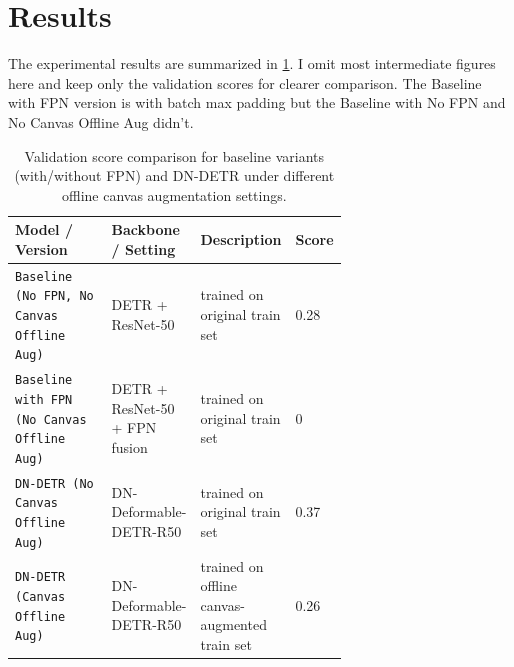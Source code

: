 \documentclass[runningheads]{llncs}
\begin{document}
\section{Results}
\label{sec:results}

The experimental results are summarized in \cref{tab:results}. I omit most intermediate figures here and keep only the validation scores for clearer comparison. The Baseline with FPN version is with batch max padding but the Baseline with No FPN and No Canvas Offline Aug didn't.

\begin{table}[tb]
    \caption{Validation score comparison for baseline variants (with/without FPN) and DN-DETR under different offline canvas augmentation settings.}
    \label{tab:results}
    \centering
    \scriptsize
    \setlength{\tabcolsep}{4pt}
    \begin{tabularx}{\linewidth}{@{}p{0.34\linewidth}p{0.24\linewidth}Xp{0.08\linewidth}@{}}
        \toprule
        Model / Version & Backbone / Setting & Description & Score \\
        \midrule
        \texttt{Baseline (No FPN, No Canvas Offline Aug)} & DETR + ResNet-50 & trained on original train set & 0.28 \\
        \texttt{Baseline with FPN (No Canvas Offline Aug)} & DETR + ResNet-50 + FPN fusion & trained on original train set & 0 \\
        \texttt{DN-DETR (No Canvas Offline Aug)} & DN-Deformable-DETR-R50 & trained on original train set & 0.37 \\
        \texttt{DN-DETR (Canvas Offline Aug)} & DN-Deformable-DETR-R50 & trained on offline canvas-augmented train set & 0.26 \\
        \bottomrule
    \end{tabularx}
\end{table}



\end{document}

